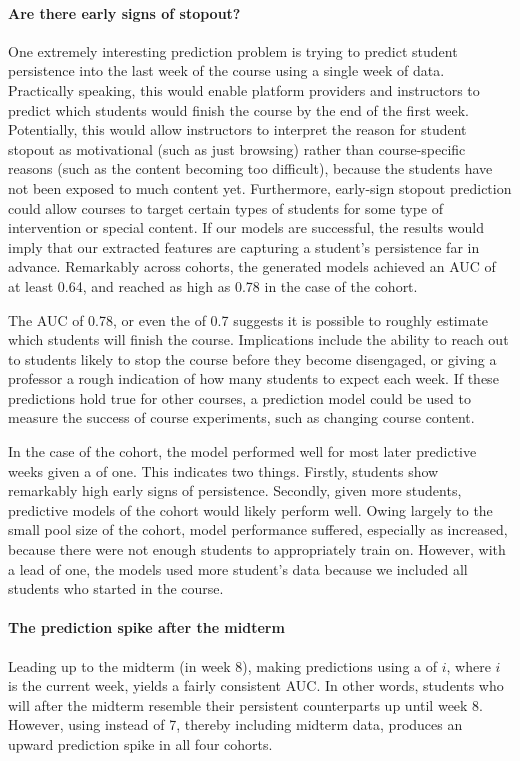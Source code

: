 \paragraph{Are there early signs of stopout?}
One extremely interesting prediction problem is trying to predict student persistence into the last week of the course using a single week of data. Practically speaking, this would enable platform providers and instructors to predict which students would finish the course by the end of the first week. Potentially, this would allow instructors to interpret the reason for student stopout as motivational (such as just browsing) rather than course-specific reasons (such as the content becoming too difficult), because the students have not been exposed to much content yet. Furthermore, early-sign stopout prediction could allow courses to target certain types of students for some type of intervention or special content. If our models are successful, the results would imply that our extracted features are capturing a student's persistence far in advance. Remarkably across cohorts, the generated models achieved an AUC of at least 0.64, and reached as high as 0.78 in the case of the \wiki cohort. 

The \wiki AUC of 0.78, or even the \neither of 0.7 suggests it is possible to roughly estimate which students will finish the course. Implications include the ability to reach out to students likely to stop the course before they become disengaged, or giving a professor a rough indication of how many students to expect each week. If these predictions hold true for other courses, a prediction model could be used to measure the success of course experiments, such as changing course content.

In the case of the \wiki cohort, the model performed well for most later predictive weeks given a \lag of one. This indicates two things. Firstly, \wiki students show remarkably high early signs of persistence. Secondly, given more students, predictive models of the \wiki cohort would likely perform well. Owing largely to the small pool size of the \wiki cohort, model performance suffered, especially as \lag increased, because there were not enough students to appropriately train on. However, with a lead of one, the models used more student's data because we included all students who started in the course.

\paragraph{The prediction spike after the midterm}
Leading up to the midterm (in week 8), making predictions using a \lag of $i$, where $i$ is the current week, yields a fairly consistent AUC. In other words, students who will \sti after the midterm resemble their persistent counterparts up until week 8. However, using  instead of 7, thereby including midterm data, produces an upward prediction spike in all four cohorts.

